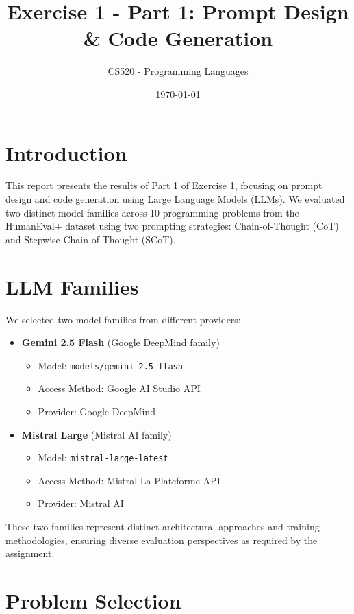 \documentclass[11pt]{article}
\title{Exercise 1 - Part 1: Prompt Design \& Code Generation}
\author{CS520 - Programming Languages}
\date{\today}
\begin{document}
\maketitle

\section{Introduction}

This report presents the results of Part 1 of Exercise 1, focusing on prompt design and code generation using Large Language Models (LLMs). We evaluated two distinct model families across 10 programming problems from the HumanEval+ dataset using two prompting strategies: Chain-of-Thought (CoT) and Stepwise Chain-of-Thought (SCoT).

\section{LLM Families}

We selected two model families from different providers:

\begin{itemize}
    \item \textbf{Gemini 2.5 Flash} (Google DeepMind family)
    \begin{itemize}
        \item Model: \texttt{models/gemini-2.5-flash}
        \item Access Method: Google AI Studio API
        \item Provider: Google DeepMind
    \end{itemize}
    
    \item \textbf{Mistral Large} (Mistral AI family)
    \begin{itemize}
        \item Model: \texttt{mistral-large-latest}
        \item Access Method: Mistral La Plateforme API
        \item Provider: Mistral AI
    \end{itemize}
\end{itemize}

These two families represent distinct architectural approaches and training methodologies, ensuring diverse evaluation perspectives as required by the assignment.

\section{Problem Selection}
\end{document}
